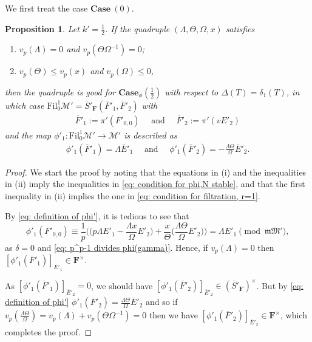 \documentclass[11pt]{amsart}
\theoremstyle{definition}
\numberwithin{equation}{subsection}
\theoremstyle{plain}
\theoremstyle{plain}
\theoremstyle{plain}
\theoremstyle{plain}
\theoremstyle{plain}
\theoremstyle{plain}
\theoremstyle{plain}
\theoremstyle{plain}
\newtheorem{prop}[equation]{Proposition}
\theoremstyle{plain}
\theoremstyle{plain}
\theoremstyle{plain}
\theoremstyle{plain}
\theoremstyle{definition}
\theoremstyle{definition}
\theoremstyle{definition}
\theoremstyle{remark}
\renewcommand{\(}{\textup{(}}
\renewcommand{\)}{\textup{)}}
\newcommand{\F}{\mathbf{F}}
\newcommand{\barS}{\overline{S}}
\newcommand{\cM}{\mathcal{M}}
\newcommand{\fM}{\mathfrak{M}}
\newcommand{\fm}{\mathfrak{m}}
\newcommand{\Fil}{\mathrm{Fil}}
\newcommand{\barE}{\overline{E}}
\newcommand{\barF}{\overline{F}}
\begin{document}
We first treat the case $\mathbf{Case}~(0)$.
\begin{prop}\label{prop: case phi 0.5, r=1}
Let $k'=\frac{1}{2}$. If the quadruple $(\Lambda,\Theta,\Omega,x)$ satisfies
    \begin{enumerate}[leftmargin=*]
    \item $v_p(\Lambda)=0$ and $v_p(\Theta\Omega^{-1})=0$;
    \item $v_p(\Theta)\leq v_p(x)$ and $v_p(\Omega)\leq 0$,
    \end{enumerate}
then the quadruple is good for $\mathbf{Case}_\phi(\frac{1}{2})$ with respect to $\Delta(T)=\delta_1(T)$, in which case $\Fil^1_{0}\cM'=\barS'_\F(\barF'_1,\barF'_2)$ with
    \begin{align*}
    \barF'_1:=\pi'(F'_{0,0})\quad\mbox{ and }\quad\barF'_2:=\pi'(vE'_2)
    \end{align*}
and the map $\phi'_1:\Fil^1_{0}\cM'\to\cM'$ is described as
    \begin{align*}
    \phi'_1(\barF'_1)=\Lambda\barE'_1\quad\mbox{ and }\quad \phi'_1(\barF'_2)= -\frac{\Lambda\Theta}{\Omega}\barE'_2.
    \end{align*}
\end{prop}


\begin{proof}
We start the proof by noting that the equations in (i) and the inequalities in (ii) imply the inequalities in \eqref{eq: condition for phi,N stable}, and that the first inequality in (ii) implies the one in \eqref{eq: condition for filtration, r=1}.



By \eqref{eq: definition of phi'}, it is tedious to see that
$$\phi'_1(F'_{0,0})\equiv\frac{1}{p}\bigg(\bigg(p\Lambda E'_1-\frac{\Lambda x}{\Omega} E'_2\bigg)+\frac{x}{\Theta}\bigg(\frac{\Lambda\Theta}{\Omega} E'_2\bigg)\bigg)= \Lambda E'_1 \pmod{\fm\fM'},
$$
as $\delta=0$ and \eqref{eq: p^p-1 divides phi(gamma)}. Hence, if $v_p(\Lambda)=0$ then $[\phi'_1(\barF'_1)]_{\barE'_1}\in\F^{\times}$.

As $[\phi'_1(\barF'_1)]_{\barE'_2}=0$, we should have $[\phi'_1(\barF'_2)]_{\barE'_2}\in(\barS'_\F)^\times$. But by \eqref{eq: definition of phi'} $\phi'_1(\barF'_2)=\frac{\Lambda\Theta}{\Omega}\barE'_2$ and so if $v_p(\frac{\Lambda\Theta}{\Omega})=v_p(\Lambda)+v_p(\Theta\Omega^{-1})=0$ then we have $[\phi'_1(\barF'_2)]_{\barE'_2}\in\F^{\times}$, which completes the proof.
\end{proof}
\end{document}
